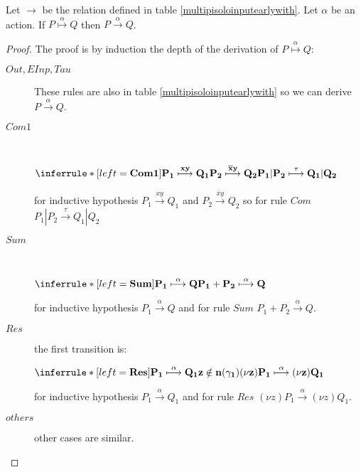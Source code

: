 \begin{proposition}
  Let $\rightarrow$ be the relation defined in table \ref{multipisoloinputearlywith}. Let $\alpha$ be an action. If $P \stackrel{\alpha}{\longmapsto} Q$ then $P\xrightarrow{\alpha} Q$.
  \begin{proof}
    The proof is by induction the depth of the derivation of $P \stackrel{\alpha}{\longmapsto} Q$:
    \begin{description}
      \item[$Out, EInp, Tau$]
	These rules are also in table \ref{multipisoloinputearlywith} so we can derive $P\xrightarrow{\alpha} Q$. 
      \item[$Com1$]\hfill \\
	    \begin{center}
	      $\inferrule* [left=\bf{Com1}]{
		  P_{1} \stackrel{xy}{\longmapsto} Q_{1}
		\\
		  P_{2} \stackrel{\overline{x}y}{\longmapsto} Q_{2}
	      }{
		P_{1}|P_{2} \stackrel{\tau}{\longmapsto} Q_{1}|Q_{2}
	      }$ 
	    \end{center}
	    for inductive hypothesis $P_{1} \xrightarrow{xy} Q_{1}$ and $P_{2} \xrightarrow{\overline{x}y} Q_{2}$ so for rule $Com$ $P_{1}|P_{2} \xrightarrow{\tau} Q_{1}|Q_{2}$
      \item[$Sum$]\hfill \\
	    \begin{center}
	      $\inferrule* [left=\bf{Sum}]{
		P_{1} \stackrel{\alpha}{\longmapsto} Q
	      }{
		P_{1}+P_{2} \stackrel{\alpha}{\longmapsto} Q
	      }$ 
	    \end{center}
	    for inductive hypothesis $P_{1} \xrightarrow{\alpha} Q$ and for rule $Sum$ $P_{1}+P_{2} \xrightarrow{\alpha} Q$.
      \item[$Res$] the first transition is:
	    \begin{center}
	      $\inferrule* [left=\bf{Res}]{
		  P_{1} \stackrel{\alpha}{\longmapsto} Q_{1}
		\\
		  z\notin n(\gamma_{1})
	      }{
		(\nu z) P_{1} \stackrel{\alpha}{\longmapsto} (\nu z)Q_{1}
	      }$ 
	    \end{center}		
	    for inductive hypothesis $P_{1} \xrightarrow{\alpha} Q_{1}$ and for rule $Res$ $(\nu z)P_{1} \xrightarrow{\alpha} (\nu z)Q_{1}$.
      \item[$others$] other cases are similar.
    \end{description}	    
  \end{proof}
\end{proposition}


